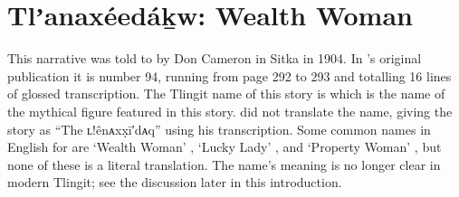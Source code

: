 
\resetexcnt
\chapter{Tlʼanaxéedáḵw: Wealth Woman}\label{ch:94-wealth-woman}

This narrative was told to \citeauthor{swanton:1909} by  Don Cameron in Sitka in 1904.
In \citeauthor{swanton:1909}’s original publication it is number 94, running from page 292 to 293 and totalling 16 lines of glossed transcription.
The Tlingit name of this story is  which is the name of the mythical figure featured in this story.
\citeauthor{swanton:1909} did not translate the name, giving the story as “The ʟ!ênᴀxx̣ī′dᴀq” using his transcription.
Some common names in English for  are ‘Wealth Woman’ , ‘Lucky Lady’ , and ‘Property Woman’ , but none of these is a literal translation.
The name’s meaning is no longer clear in modern Tlingit; see the discussion later in this introduction.

